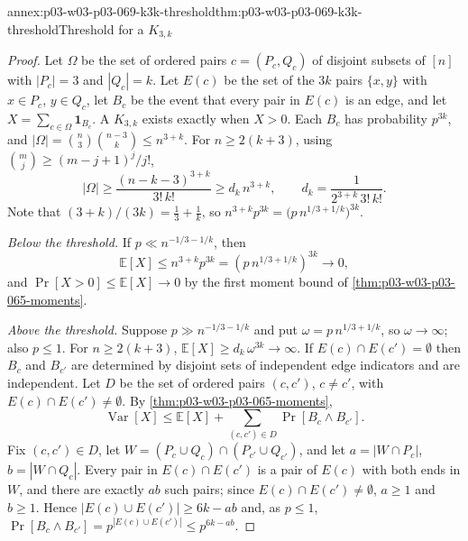 \begin{annexitem}{annex:p03-w03-p03-069-k3k-threshold}{thm:p03-w03-p03-069-k3k-threshold}{Threshold for a \(K_{3,k}\)}
\begin{proof}
Let \(\Omega\) be the set of ordered pairs \(c=(P_c,Q_c)\) of disjoint subsets
of \([n]\) with \(|P_c|=3\) and \(|Q_c|=k\).  Let \(E(c)\) be the set of the
\(3k\) pairs \(\{x,y\}\) with \(x\in P_c\), \(y\in Q_c\), let \(B_c\) be the
event that every pair in \(E(c)\) is an edge, and let
\(X=\sum_{c\in\Omega}\mathbf 1_{B_c}\).  A \(K_{3,k}\) exists exactly when
\(X>0\).  Each \(B_c\) has probability \(p^{3k}\), and
\(|\Omega|=\binom n3\binom{n-3}k\leq n^{3+k}\).  For \(n\geq2(k+3)\), using
\(\binom mj\geq(m-j+1)^j/j!\),
\[
  |\Omega|\geq\frac{(n-k-3)^{3+k}}{3!\,k!}\geq d_k\,n^{3+k},
  \qquad d_k=\frac{1}{2^{3+k}\,3!\,k!}.
\]
Note that \((3+k)/(3k)=\tfrac13+\tfrac1k\), so
\(n^{3+k}p^{3k}=\bigl(p\,n^{1/3+1/k}\bigr)^{3k}\).

\emph{Below the threshold.}  If \(p\ll n^{-1/3-1/k}\), then
\[
  \mathbb E[X]\leq n^{3+k}p^{3k}=(p\,n^{1/3+1/k})^{3k}\to0,
\]
and
\(\Pr[X>0]\leq\mathbb E[X]\to0\) by the first moment bound of
\cref{thm:p03-w03-p03-065-moments}.

\emph{Above the threshold.}  Suppose \(p\gg n^{-1/3-1/k}\) and put
\(\omega=p\,n^{1/3+1/k}\), so \(\omega\to\infty\); also \(p\leq1\).  For
\(n\geq2(k+3)\), \(\mathbb E[X]\geq d_k\,\omega^{3k}\to\infty\).  If
\(E(c)\cap E(c')=\emptyset\) then \(B_c\) and \(B_{c'}\) are determined by
disjoint sets of independent edge indicators and are independent.  Let \(D\)
be the set of ordered pairs \((c,c')\), \(c\neq c'\), with
\(E(c)\cap E(c')\neq\emptyset\).  By \cref{thm:p03-w03-p03-065-moments},
\[
  \operatorname{Var}[X]\leq\mathbb E[X]+\sum_{(c,c')\in D}\Pr[B_c\wedge B_{c'}] .
\]
Fix \((c,c')\in D\), let \(W=(P_c\cup Q_c)\cap(P_{c'}\cup Q_{c'})\), and let
\(a=|W\cap P_c|\), \(b=|W\cap Q_c|\).  Every pair in \(E(c)\cap E(c')\) is a
pair of \(E(c)\) with both ends in \(W\), and there are exactly \(ab\) such
pairs; since \(E(c)\cap E(c')\neq\emptyset\), \(a\geq1\) and \(b\geq1\).
Hence \(|E(c)\cup E(c')|\geq6k-ab\) and, as \(p\leq1\),
\(\Pr[B_c\wedge B_{c'}]=p^{|E(c)\cup E(c')|}\leq p^{6k-ab}\).


\end{proof}
\end{annexitem}

